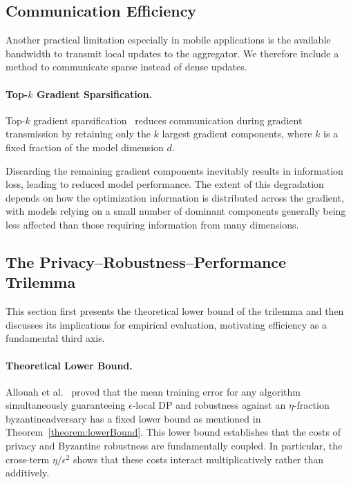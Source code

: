 \documentclass[11pt,twocolumn,a4paper,DIV=calc,parskip=half]{scrartcl}
\begin{document}
	\subsection{Communication Efficiency}
	Another practical limitation especially in mobile applications is the available bandwidth to transmit local updates to the aggregator. We therefore include a method to communicate sparse instead of dense updates.
	
	\paragraph{Top-$k$ Gradient Sparsification.}
	
	Top-$k$ gradient sparsification~\cite{aji2017topk} reduces communication during gradient transmission by retaining only the $k$ largest gradient components, where $k$ is a fixed fraction of the model dimension $d$.
	
	Discarding the remaining gradient components inevitably results in information loss, leading to reduced model performance. The extent of this degradation depends on how the optimization information is distributed across the gradient, with models relying on a small number of dominant components generally being less affected than those requiring information from many dimensions.
	
	\subsection{The Privacy--Robustness--Performance Trilemma}
	This section first presents the theoretical lower bound of the trilemma and then discusses its implications for empirical evaluation, motivating efficiency as a fundamental third axis.
		
	\paragraph{Theoretical Lower Bound.}
	
	Allouah et al.~\cite{allouah2023trilemma} proved that the mean training error for any algorithm simultaneously guaranteeing $\epsilon$-local DP and robustness against an $\eta$-fraction \gls{byzantineadversary} has a fixed lower bound as mentioned in Theorem~\ref{theorem:lowerBound}.
	This lower bound establishes that the costs of privacy and Byzantine robustness are fundamentally coupled. In particular, the cross-term $\eta/\epsilon^2$ shows that these costs interact multiplicatively rather than additively.
	
\end{document}
